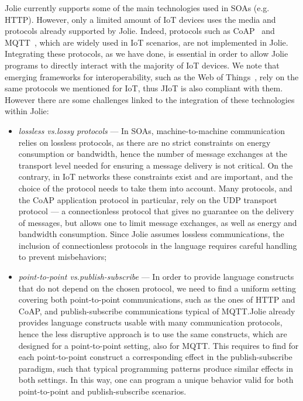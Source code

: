 Jolie currently supports some of the main technologies used in SOAs (e.g.
HTTP). However, only a limited amount of IoT devices uses the media and
protocols already supported by Jolie. Indeed, protocols such as
CoAP~\cite{doi:10.17487/RFC7252,coap} and MQTT~\cite{mqtt-v3.1.1,mqtt},
which are widely used in IoT scenarios, are not implemented in Jolie.
Integrating these protocols, as we have done, is essential in order to allow
Jolie programs to directly interact with the majority of IoT devices. We note
that emerging frameworks for interoperability, such as the Web of
Things~\cite{w3c17}, rely on the same protocols we mentioned for IoT, thus JIoT
is also compliant with them.
%
However there are some
challenges linked to the integration of these technologies within Jolie:

\begin{itemize}
  \item \textit{lossless vs.\@ lossy protocols} --- In SOAs,
  machine-to-machine communication relies on lossless protocols, as there are no
  strict constraints on energy consumption or bandwidth, hence the number of
  message exchanges at the transport level needed for ensuring a message
  delivery is not critical. On the contrary, in IoT networks these
  constraints exist and are important, and the choice of the protocol needs to
  take them into account. Many protocols, and the CoAP application protocol in
  particular, rely on the UDP transport protocol --- a connectionless protocol
  that gives no guarantee on the delivery of messages, but allows one to limit
  message exchanges, as well as energy and bandwidth consumption. Since Jolie assumes
  lossless communications, the inclusion of connectionless protocols in the
  language requires careful handling to prevent misbehaviors;

  \item \textit{point-to-point vs.\@ publish-subscribe} --- In order
  to provide language constructs that do not depend on the chosen protocol, we
  need to find a uniform setting covering both point-to-point communications,
  such as the ones of HTTP and CoAP, and publish-subscribe communications
  typical of MQTT.\@ Jolie already provides language constructs usable with many
  communication protocols, hence the less disruptive approach is to use the same
  constructs, which are designed for a point-to-point setting, also for MQTT.\@
  This requires to find for each point-to-point construct a corresponding effect
  in the publish-subscribe paradigm, such that typical programming patterns
  produce similar effects in both settings. In this way, one can program a
  unique behavior valid for both point-to-point and publish-subscribe
  scenarios.
  
\end{itemize} 


